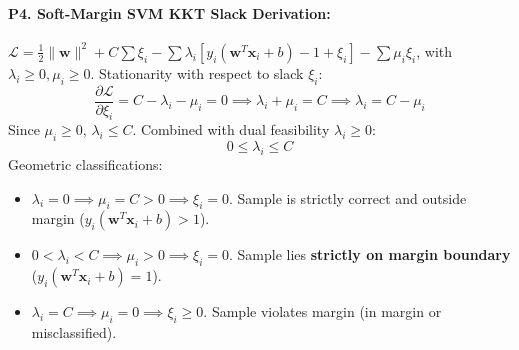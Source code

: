 \paragraph{P4. Soft-Margin SVM KKT Slack Derivation:}
$\mathcal{L} = \frac{1}{2}\|\mathbf{w}\|^2 + C\sum \xi_i - \sum \lambda_i [y_i(\mathbf{w}^T \mathbf{x}_i + b) - 1 + \xi_i] - \sum \mu_i \xi_i$, with $\lambda_i \ge 0, \mu_i \ge 0$.
Stationarity with respect to slack $\xi_i$:
\begin{equation*}
\frac{\partial \mathcal{L}}{\partial \xi_i} = C - \lambda_i - \mu_i = 0 \implies \lambda_i + \mu_i = C \implies \lambda_i = C - \mu_i
\end{equation*}
Since $\mu_i \ge 0$, $\lambda_i \le C$. Combined with dual feasibility $\lambda_i \ge 0$:
\begin{equation*}
0 \le \lambda_i \le C
\end{equation*}
Geometric classifications:
\begin{itemize}
    \item $\lambda_i = 0 \implies \mu_i = C > 0 \implies \xi_i = 0$. Sample is strictly correct and outside margin ($y_i(\mathbf{w}^T \mathbf{x}_i + b) > 1$).
    \item $0 < \lambda_i < C \implies \mu_i > 0 \implies \xi_i = 0$. Sample lies \textbf{strictly on margin boundary} ($y_i(\mathbf{w}^T \mathbf{x}_i + b) = 1$).
    \item $\lambda_i = C \implies \mu_i = 0 \implies \xi_i \ge 0$. Sample violates margin (in margin or misclassified).
\end{itemize}


